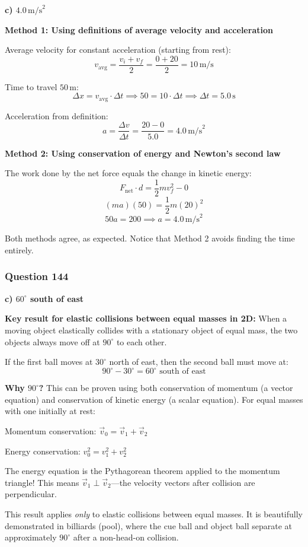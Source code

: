 \documentclass[12pt,letterpaper]{article}
\begin{document}
\begin{answerbox}
\textbf{c) $4.0\,\text{m/s}^2$}
\end{answerbox}

\begin{explanationbox}
\textbf{Method 1: Using definitions of average velocity and acceleration}

Average velocity for constant acceleration (starting from rest):
\[
v_{\text{avg}} = \frac{v_i + v_f}{2} = \frac{0 + 20}{2} = 10\,\text{m/s}
\]

Time to travel $50\,\text{m}$:
\[
\Delta x = v_{\text{avg}} \cdot \Delta t \implies 50 = 10 \cdot \Delta t \implies \Delta t = 5.0\,\text{s}
\]

Acceleration from definition:
\[
a = \frac{\Delta v}{\Delta t} = \frac{20 - 0}{5.0} = 4.0\,\text{m/s}^2
\]

\textbf{Method 2: Using conservation of energy and Newton's second law}

The work done by the net force equals the change in kinetic energy:
\[
F_{\text{net}} \cdot d = \frac{1}{2}mv_f^2 - 0
\]
\[
(ma)(50) = \frac{1}{2}m(20)^2
\]
\[
50a = 200 \implies a = 4.0\,\text{m/s}^2
\]

Both methods agree, as expected. Notice that Method 2 avoids finding the time entirely.
\end{explanationbox}

\subsubsection*{Question 144}

\begin{answerbox}
\textbf{c) $60^\circ$ south of east}
\end{answerbox}

\begin{explanationbox}
\textbf{Key result for elastic collisions between equal masses in 2D:} When a moving object elastically collides with a stationary object of equal mass, the two objects always move off at $90^\circ$ to each other.

If the first ball moves at $30^\circ$ north of east, then the second ball must move at:
\[
90^\circ - 30^\circ = 60^\circ \text{ south of east}
\]

\textbf{Why $90^\circ$?} This can be proven using both conservation of momentum (a vector equation) and conservation of kinetic energy (a scalar equation). For equal masses with one initially at rest:

Momentum conservation: $\vec{v}_0 = \vec{v}_1 + \vec{v}_2$

Energy conservation: $v_0^2 = v_1^2 + v_2^2$

The energy equation is the Pythagorean theorem applied to the momentum triangle! This means $\vec{v}_1 \perp \vec{v}_2$---the velocity vectors after collision are perpendicular.

This result applies \emph{only} to elastic collisions between equal masses. It is beautifully demonstrated in billiards (pool), where the cue ball and object ball separate at approximately $90^\circ$ after a non-head-on collision.
\end{explanationbox}
\end{document}
